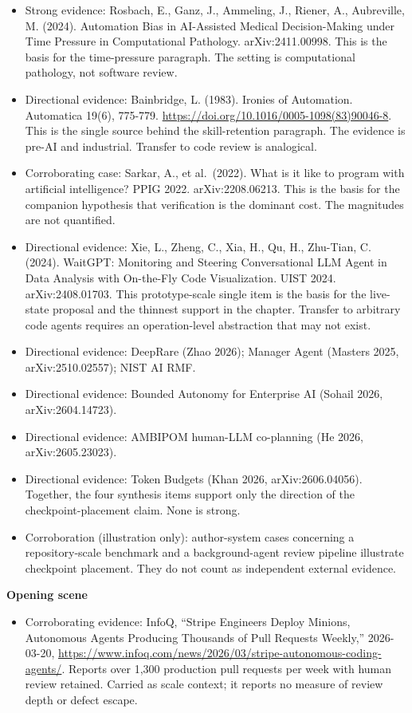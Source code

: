 \begin{itemize}
\tightlist
\item
  Strong evidence: Rosbach, E., Ganz, J., Ammeling, J., Riener, A., Aubreville, M. (2024). Automation Bias in AI-Assisted Medical Decision-Making under Time Pressure in Computational Pathology. arXiv:2411.00998. This is the basis for the time-pressure paragraph. The setting is computational pathology, not software review.
\item
  Directional evidence: Bainbridge, L. (1983). Ironies of Automation. Automatica 19(6), 775-779. \url{https://doi.org/10.1016/0005-1098(83)90046-8}. This is the single source behind the skill-retention paragraph. The evidence is pre-AI and industrial. Transfer to code review is analogical.
\item
  Corroborating case: Sarkar, A., et al.~(2022). What is it like to program with artificial intelligence? PPIG 2022. arXiv:2208.06213. This is the basis for the companion hypothesis that verification is the dominant cost. The magnitudes are not quantified.
\item
  Directional evidence: Xie, L., Zheng, C., Xia, H., Qu, H., Zhu-Tian, C. (2024). WaitGPT: Monitoring and Steering Conversational LLM Agent in Data Analysis with On-the-Fly Code Visualization. UIST 2024. arXiv:2408.01703. This prototype-scale single item is the basis for the live-state proposal and the thinnest support in the chapter. Transfer to arbitrary code agents requires an operation-level abstraction that may not exist.
\item
  Directional evidence: DeepRare (Zhao 2026); Manager Agent (Masters 2025, arXiv:2510.02557); NIST AI RMF.
\item
  Directional evidence: Bounded Autonomy for Enterprise AI (Sohail 2026, arXiv:2604.14723).
\item
  Directional evidence: AMBIPOM human-LLM co-planning (He 2026, arXiv:2605.23023).
\item
  Directional evidence: Token Budgets (Khan 2026, arXiv:2606.04056). Together, the four synthesis items support only the direction of the checkpoint-placement claim. None is strong.
\item
  Corroboration (illustration only): author-system cases concerning a repository-scale benchmark and a background-agent review pipeline illustrate checkpoint placement. They do not count as independent external evidence.
\end{itemize}

\textbf{Opening scene}

\begin{itemize}
\tightlist
\item
  Corroborating evidence: InfoQ, ``Stripe Engineers Deploy Minions, Autonomous Agents Producing Thousands of Pull Requests Weekly,'' 2026-03-20, \url{https://www.infoq.com/news/2026/03/stripe-autonomous-coding-agents/}. Reports over 1,300 production pull requests per week with human review retained. Carried as scale context; it reports no measure of review depth or defect escape.
\end{itemize}
